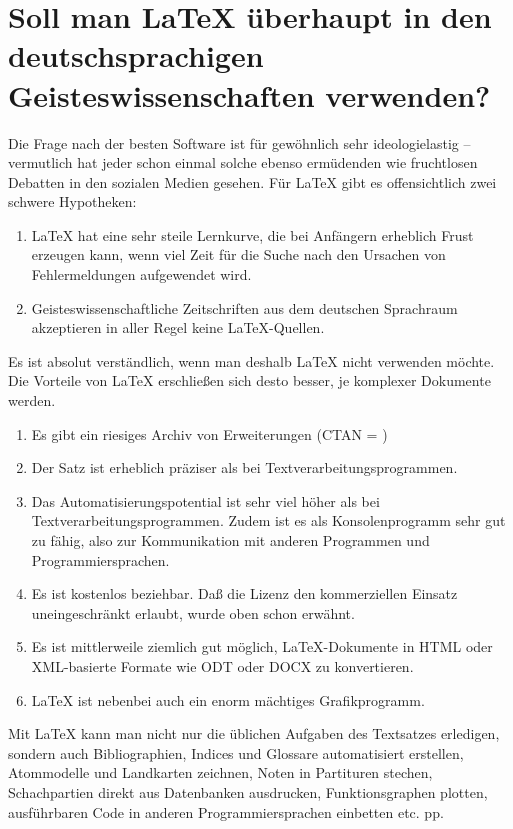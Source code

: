 \documentclass[12pt,table]{scrreprt}
\begin{document}
\section{Soll man \LaTeX{} überhaupt in den deutschsprachigen Geisteswissenschaften verwenden?}
Die Frage nach der besten Software ist für gewöhnlich sehr ideologielastig -- vermutlich hat jeder schon  einmal solche ebenso ermüdenden wie fruchtlosen Debatten in den sozialen Medien gesehen. Für \LaTeX{} gibt es offensichtlich zwei schwere Hypotheken:
\begin{enumerate}
\item \LaTeX{} hat eine sehr steile Lernkurve, die bei Anfängern erheblich Frust erzeugen kann, wenn viel Zeit für die Suche nach den Ursachen von Fehlermeldungen aufgewendet wird.
\item Geisteswissenschaftliche Zeitschriften aus dem deutschen Sprachraum akzeptieren in aller Regel keine \LaTeX-Quellen.
\end{enumerate}
Es ist absolut verständlich, wenn man deshalb \LaTeX{} nicht verwenden möchte. Die Vorteile von \LaTeX{} erschließen sich desto besser, je komplexer Dokumente werden.
\begin{enumerate}
\item Es gibt ein riesiges Archiv von Erweiterungen (CTAN = )
\item Der Satz ist erheblich präziser als bei Textverarbeitungsprogrammen.
\item Das Automatisierungspotential ist sehr viel höher als bei Textverarbeitungsprogrammen. Zudem ist es als Konsolenprogramm sehr gut zu  fähig, also zur Kommunikation mit anderen Programmen und Programmiersprachen.
\item Es ist kostenlos beziehbar. Daß die Lizenz den kommerziellen Einsatz uneingeschränkt erlaubt, wurde oben schon erwähnt.
\item Es ist mittlerweile ziemlich gut möglich, \LaTeX-Dokumente in HTML oder XML-basierte Formate wie ODT oder DOCX zu konvertieren.
\item \LaTeX{} ist nebenbei auch ein enorm mächtiges Grafikprogramm.
\end{enumerate}

Mit \LaTeX{} kann man nicht nur die üblichen Aufgaben des Textsatzes erledigen, sondern auch Bibliographien, Indices und Glossare automatisiert erstellen, Atommodelle und Landkarten zeichnen, Noten in Partituren stechen, Schachpartien direkt aus Datenbanken ausdrucken, Funktionsgraphen plotten, ausführbaren Code in anderen Programmiersprachen einbetten etc. pp.
\end{document}
